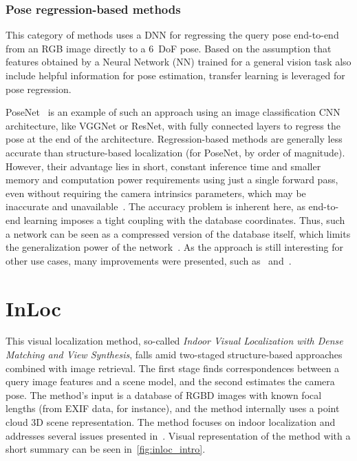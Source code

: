 \subsubsection*{Pose regression-based methods}

This category of methods uses a DNN for regressing the query pose end-to-end from an RGB image
directly to a 6~DoF pose. Based on the assumption that features obtained by a Neural Network (NN) trained for a general vision task
also include helpful information for pose estimation, transfer learning is leveraged for pose regression.

PoseNet~\citep{PoseNet} is an example of such an approach using an image classification CNN architecture, like
VGGNet or ResNet, with fully connected layers to regress the pose at the end of the architecture. Regression-based
methods are generally less accurate than structure-based localization (for PoseNet, by order of magnitude).
However, their advantage lies in short, constant inference time and smaller memory and computation power requirements
using just a single forward pass, even without requiring the camera intrinsics parameters, which may be
inaccurate and unavailable~\citep{RegressionAutoEnc}. The accuracy problem is inherent here, as end-to-end
learning imposes a tight coupling with the database coordinates. Thus, such a network can be seen as a compressed
version of the database itself, which limits the generalization power of the network~\citep{naverlabs}. As the approach is still
interesting for other use cases, many improvements were presented, such as~\citet{DNNRegression, Maps, VLocNet}
and~\citet{VLocNetpp}.


\section{InLoc}
This visual localization method, so-called \emph{Indoor Visual Localization with Dense Matching
and View Synthesis}, falls amid two-staged structure-based approaches combined with image retrieval. The first stage finds correspondences between a query image features and a scene model, and the second estimates the camera pose.
The method's input is a database of RGBD
images with known focal lengths (from EXIF data, for instance), and the method internally uses a point cloud 3D scene
representation. The method focuses on indoor localization and addresses several 
issues presented in~. Visual representation of the method with a short summary can be seen in~\cref{fig:inloc_intro}. 

